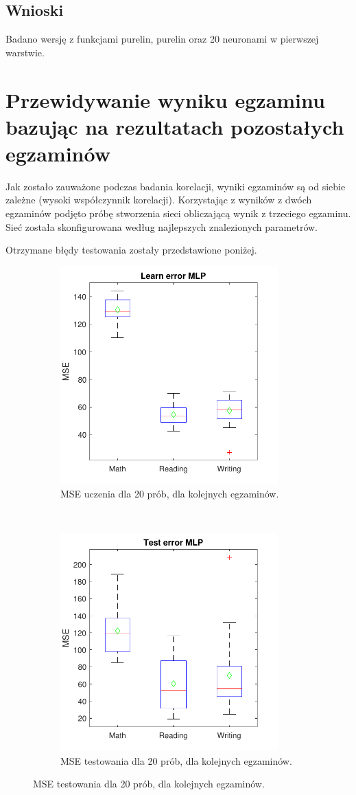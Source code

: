 \documentclass[12pt]{article}
\begin{document}
\subsection{Wnioski}
Badano wersję z funkcjami purelin, purelin oraz 20 neuronami w pierwszej warstwie.

\pagebreak
\section{Przewidywanie wyniku egzaminu bazując na rezultatach pozostałych egzaminów}
Jak zostało zauważone podczas badania korelacji, wyniki egzaminów są od siebie zależne (wysoki współczynnik korelacji). Korzystając z wyników z dwóch egzaminów podjęto próbę stworzenia sieci obliczającą wynik z trzeciego egzaminu. Sieć została skonfigurowana według najlepszych znalezionych parametrów.

Otrzymane błędy testowania zostały przedstawione poniżej.

\begin{figure}[H]
\centering
\begin{subfigure}[t]{0.48\textwidth} 
\centering
\includegraphics[height=3.3in]{cz3_egz_learn.pdf}
\caption{MSE uczenia dla 20 prób, dla kolejnych egzaminów.}
\end{subfigure}
~~
\begin{subfigure}[t]{0.48\textwidth} 
\centering
\includegraphics[height=3.3in]{cz3_egz_test.pdf}
\caption{MSE testowania dla 20 prób, dla kolejnych egzaminów.}
\end{subfigure}
\end{figure}
\end{document}
